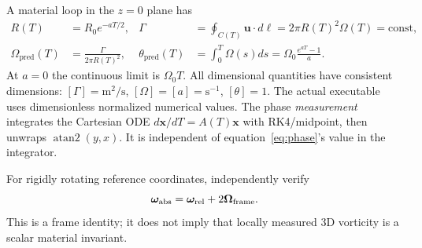 \documentclass[10pt,a4paper]{article}
\begin{document}
A material loop in the $z=0$ plane has
\begin{align}
R(T)&=R_0 e^{-aT/2}, & \Gamma&=\oint_{C(T)}\mathbf u\cdot d\mathbf\ell
=2\pi R(T)^2\Omega(T)=\mathrm{const},\label{eq:kelvin}\\
\Omega_{\mathrm{pred}}(T)&=\frac{\Gamma}{2\pi R(T)^2},&
\theta_{\mathrm{pred}}(T)&=\int_0^T\Omega(s)ds
=\Omega_0\frac{e^{aT}-1}{a}.\label{eq:phase}
\end{align}
At $a=0$ the continuous limit is $\Omega_0T$. All dimensional quantities have consistent dimensions: $[\Gamma]=\mathrm{m^2/s}$, $[\Omega]=[a]=\mathrm{s^{-1}}$, $[\theta]=1$. The actual executable uses dimensionless normalized numerical values. The phase \emph{measurement} integrates the Cartesian ODE $d\mathbf x/dT=A(T)\mathbf x$ with RK4/midpoint, then unwraps $\operatorname{atan2}(y,x)$. It is independent of equation~\eqref{eq:phase}'s value in the integrator.

For rigidly rotating reference coordinates, independently verify
\begin{equation}
\bm\omega_{\rm abs}=\bm\omega_{\rm rel}+2\bm\Omega_{\rm frame}.
\label{eq:frame}
\end{equation}
This is a frame identity; it does not imply that locally measured 3D vorticity is a scalar material invariant.
\end{document}
